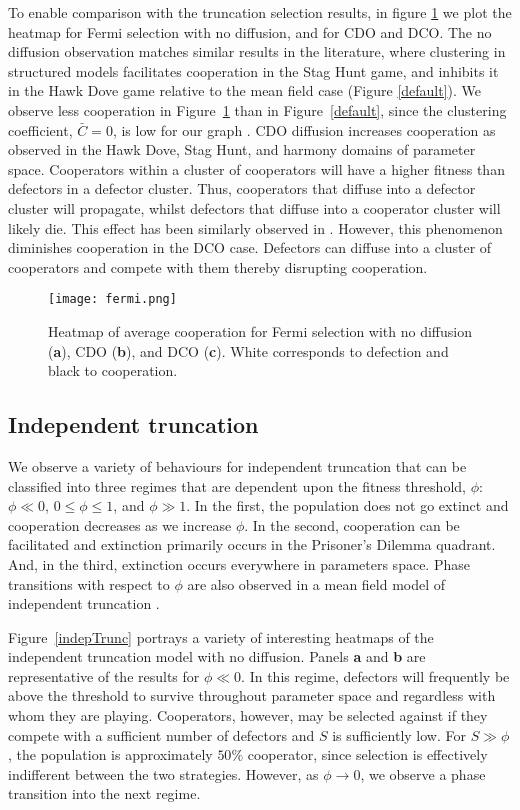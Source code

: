 \documentclass[reprint,aps,pre,twocolumn]{revtex4-1}
\begin{document}
To enable comparison with the truncation selection results, in figure \ref{fermi} we plot the heatmap for Fermi selection with no diffusion, and for CDO and DCO. The no diffusion observation matches similar results in the literature, where clustering in structured models facilitates cooperation in the Stag Hunt game, and inhibits it in the Hawk Dove game \cite{roca09} relative to the mean field case (Figure \ref{default}). We observe less cooperation in Figure~\ref{fermi} than in Figure~\ref{default}, since the clustering coefficient, $\bar{C} = 0$, is low for our graph \cite{albert02}. CDO diffusion increases cooperation as observed in the Hawk Dove, Stag Hunt, and harmony domains of parameter space. Cooperators within a cluster of cooperators will have a higher fitness than defectors in a defector cluster. Thus, cooperators that diffuse into a defector cluster will propagate, whilst defectors that diffuse into a cooperator cluster will likely die. This effect has been similarly observed in \cite{sicardi09, vainstein07}. However, this phenomenon diminishes cooperation in the DCO case. Defectors can diffuse into a cluster of cooperators and compete with them thereby disrupting cooperation.

\begin{figure}
\texttt{[image: fermi.png]}
\caption{Heatmap of average cooperation for Fermi selection with no diffusion (\textbf{a}), CDO (\textbf{b}), and DCO (\textbf{c}). White corresponds to defection and black to cooperation.}
\label{fermi}
\end{figure}

\subsection{Independent truncation}

We observe a variety of behaviours for independent truncation that can be classified into three regimes that are dependent upon the fitness threshold, $\phi$: $\phi \ll 0$, $0 \leq \phi \leq 1 $, and $\phi \gg 1$. In the first, the population does not go extinct and cooperation decreases as we increase $\phi$. In the second, cooperation can be facilitated and extinction primarily occurs in the Prisoner's Dilemma quadrant. And, in the third, extinction occurs everywhere in parameters space. Phase transitions with respect to $\phi$ are also observed in a mean field model of independent truncation \cite{morsky16}.

Figure~\ref{indepTrunc} portrays a variety of interesting heatmaps of the independent truncation model with no diffusion. Panels \textbf{a} and \textbf{b} are representative of the results for $\phi \ll 0$. In this regime, defectors will frequently be above the threshold to survive throughout parameter space and regardless with whom they are playing. Cooperators, however, may be selected against if they compete with a sufficient number of defectors and $S$ is sufficiently low. For $S \gg \phi$, the population is approximately $50\%$ cooperator, since selection is effectively indifferent between the two strategies. However, as $\phi \to 0$, we observe a phase transition into the next regime.
\end{document}
